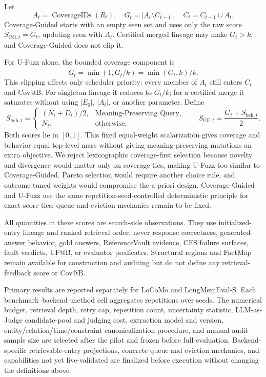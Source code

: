 Let
\begin{equation}
A_t=\operatorname{CoverageIDs}(R_t),\quad
G_t=|A_t\setminus C_{t-1}|,\quad
C_t=C_{t-1}\cup A_t.
\label{eq:online-entry-gain}
\end{equation}
Coverage-Guided starts with an empty seen set and uses only the raw score
\(S_{\mathrm{CG},t}=G_t\), updating seen with \(A_t\). Certified merged
lineage may make \(G_t>k\), and Coverage-Guided does not clip it.

For U-Fuzz alone, the bounded coverage component is
\begin{equation}
\widetilde{G}_t=\min(1,G_t/k)=\min(G_t,k)/k.
\label{eq:bounded-entry-gain}
\end{equation}
This clipping affects only scheduler priority: every member of \(A_t\) still
enters \(C_t\) and Cov@B. For singleton lineage it reduces to \(G_t/k\); for a
certified merge it saturates without using \(|E_0|\), \(|A_t|\), or another
parameter. Define
\begin{equation}
S_{\mathrm{beh},t}=
\begin{cases}
(N_t+D_t)/2,&\text{Meaning-Preserving Query},\\
N_t,&\text{otherwise},
\end{cases}
\qquad
S_{\mathrm{UF},t}=\frac{\widetilde{G}_t+S_{\mathrm{beh},t}}{2}.
\label{eq:ufuzz-priority}
\end{equation}
Both scores lie in \([0,1]\). This fixed equal-weight scalarization gives
coverage and behavior equal top-level mass without giving meaning-preserving
mutations an extra objective. We reject lexicographic coverage-first selection
because novelty and divergence would matter only on coverage ties, making
U-Fuzz too similar to Coverage-Guided. Pareto selection would require another
choice rule, and outcome-tuned weights would compromise the a priori design.
Coverage-Guided and U-Fuzz use the same repetition-seed-controlled
deterministic principle for exact score ties; queue and eviction mechanics
remain to be fixed.

All quantities in these scores are search-side observations. They use
initialized-entry lineage and ranked retrieval order, never response
correctness, generated-answer behavior, gold answers, ReferenceVault evidence,
CFS failure surfaces, fault verdicts, UF@B, or evaluator predicates. Structural
regions and FactMap remain available for construction and auditing but do not
define any retrieval-feedback score or Cov@B.

Primary results are reported separately for LoCoMo and LongMemEval-S. Each
benchmark--backend--method cell aggregates repetitions over seeds. The
numerical budget, retrieval depth, retry cap, repetition count, uncertainty
statistic, LLM-as-Judge candidate-pool and judging cost, extraction model and
version, entity/relation/time/constraint canonicalization procedure, and
manual-audit sample size are selected after the pilot and frozen before full
evaluation. Backend-specific retrievable-entry projections, concrete queue and
eviction mechanics, and capabilities not yet live-validated are finalized
before execution without changing the definitions above.
